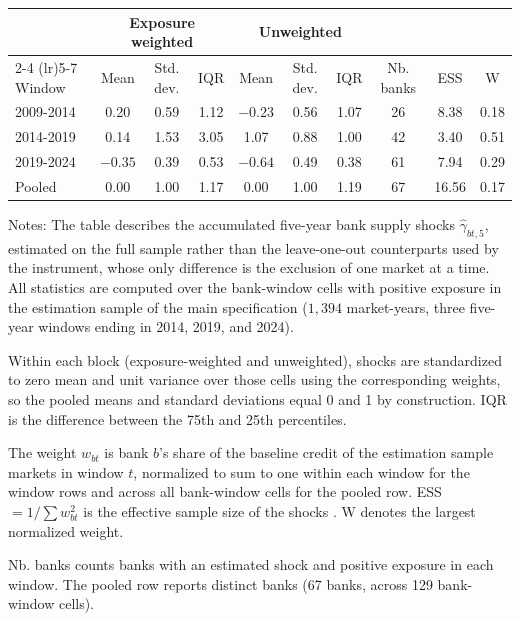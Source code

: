 \begin{threeparttable}
    \begin{tabular}{lccccccccc}
        \toprule
         & \multicolumn{3}{c}{Exposure weighted} & \multicolumn{3}{c}{Unweighted} & & & \\
        \cmidrule(lr){2-4} \cmidrule(lr){5-7}
        Window & Mean & Std. dev. & IQR & Mean & Std. dev. & IQR & Nb. banks & ESS & W \\
        \midrule
        2009-2014 & 0.20    & 0.59 & 1.12 & $-0.23$ & 0.56 & 1.07 & 26 & 8.38  & 0.18 \\
        2014-2019 & 0.14    & 1.53 & 3.05 & 1.07    & 0.88 & 1.00 & 42 & 3.40  & 0.51 \\
        2019-2024 & $-0.35$ & 0.39 & 0.53 & $-0.64$ & 0.49 & 0.38 & 61 & 7.94  & 0.29 \\
        \midrule
        Pooled     & 0.00    & 1.00 & 1.17 & 0.00    & 1.00 & 1.19 & 67 & 16.56 & 0.17 \\
        \bottomrule
    \end{tabular}
    \begin{tablenotes}[flushleft]
        \footnotesize
        \item Notes: The table describes the accumulated five-year bank supply shocks $\hat{\gamma}_{bt,5}$, estimated on the full sample rather than the leave-one-out counterparts used by the instrument, whose only difference is the exclusion of one market at a time. All statistics are computed over the bank-window cells with positive exposure in the estimation sample of the main specification ($1{,}394$ market-years, three five-year windows ending in 2014, 2019, and 2024).
        \item Within each block (exposure-weighted and unweighted), shocks are standardized to zero mean and unit variance over those cells using the corresponding weights, so the pooled means and standard deviations equal 0 and 1 by construction. IQR is the difference between the 75th and 25th percentiles.
        \item The weight $w_{bt}$ is bank $b$'s share of the baseline credit of the estimation sample markets in window $t$, normalized to sum to one within each window for the window rows and across all bank-window cells for the pooled row. ESS $=1/\sum w_{bt}^{2}$ is the effective sample size of the shocks \citep{borusyak2022quasi}. W denotes the largest normalized weight.
        \item Nb. banks counts banks with an estimated shock and positive exposure in each window. The pooled row reports distinct banks (67 banks, across 129 bank-window cells).
    \end{tablenotes}
\end{threeparttable}